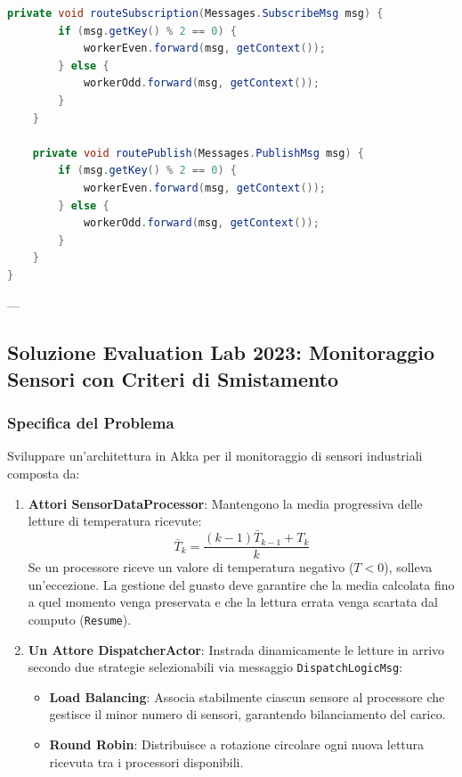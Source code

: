 \begin{lstlisting}[language=Java, caption={BrokerActor con Switch Dinamico del Comportamento e Supervisione Resume}]
    private void routeSubscription(Messages.SubscribeMsg msg) {
        if (msg.getKey() % 2 == 0) {
            workerEven.forward(msg, getContext());
        } else {
            workerOdd.forward(msg, getContext());
        }
    }

    private void routePublish(Messages.PublishMsg msg) {
        if (msg.getKey() % 2 == 0) {
            workerEven.forward(msg, getContext());
        } else {
            workerOdd.forward(msg, getContext());
        }
    }
}
\end{lstlisting}

---

\subsection{Soluzione Evaluation Lab 2023: Monitoraggio Sensori con Criteri di Smistamento}

\subsubsection{Specifica del Problema}
Sviluppare un'architettura in Akka per il monitoraggio di sensori industriali composta da:
\begin{enumerate}
    \item \textbf{Attori SensorDataProcessor}: Mantengono la media progressiva delle letture di temperatura ricevute:
    \begin{equation}
    \bar{T}_{k} = \frac{(k-1)\bar{T}_{k-1} + T_k}{k}
    \end{equation}
    Se un processore riceve un valore di temperatura negativo ($T < 0$), solleva un'eccezione. La gestione del guasto deve garantire che la media calcolata fino a quel momento venga preservata e che la lettura errata venga scartata dal computo (\texttt{Resume}).
    \item \textbf{Un Attore DispatcherActor}: Instrada dinamicamente le letture in arrivo secondo due strategie selezionabili via messaggio \texttt{DispatchLogicMsg}:
    \begin{itemize}
        \item \textbf{Load Balancing}: Associa stabilmente ciascun sensore al processore che gestisce il minor numero di sensori, garantendo bilanciamento del carico.
        \item \textbf{Round Robin}: Distribuisce a rotazione circolare ogni nuova lettura ricevuta tra i processori disponibili.
    \end{itemize}
\end{enumerate}

